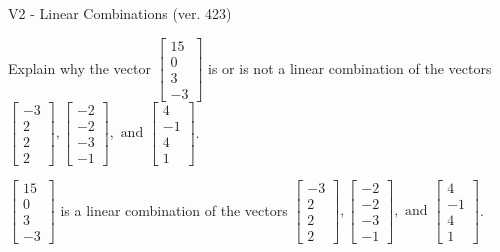 \begin{exercise}
  \begin{exerciseTitle}V2 - Linear Combinations (ver. 423)\end{exerciseTitle}
  \begin{exerciseStatement}
    Explain why the vector \(\left[\begin{array}{c}
15 \\
0 \\
3 \\
-3
\end{array}\right]\)  is or is not a linear 
	combination of the vectors \(\left[\begin{array}{c}
-3 \\
2 \\
2 \\
2
\end{array}\right] , \left[\begin{array}{c}
-2 \\
-2 \\
-3 \\
-1
\end{array}\right] , \text{ and } \left[\begin{array}{c}
4 \\
-1 \\
4 \\
1
\end{array}\right]\).
	


  \end{exerciseStatement}
  \begin{exerciseAnswer}
   \(\left[\begin{array}{c}
15 \\
0 \\
3 \\
-3
\end{array}\right]\) 
  	 is  
	a linear combination of the vectors \(\left[\begin{array}{c}
-3 \\
2 \\
2 \\
2
\end{array}\right] , \left[\begin{array}{c}
-2 \\
-2 \\
-3 \\
-1
\end{array}\right] , \text{ and } \left[\begin{array}{c}
4 \\
-1 \\
4 \\
1
\end{array}\right]\).

	
  


  \end{exerciseAnswer}
\end{exercise}